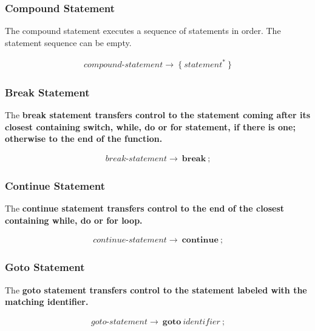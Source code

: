 \documentclass[a4paper,oneside,11pt]{article}
\begin{document}
\subsubsection{Compound Statement}\label{compoundstatement}

The compound statement executes a sequence of statements in order. The statement sequence can be empty.

\begin{align*}
compound\textrm{-}statement \rightarrow \> \texttt{\{} \> \hyperref[statement]{statement}^* \> \texttt{\}}
\end{align*}

\subsubsection{Break Statement}\label{breakstatement}

The \bf{break} statement transfers control to the statement coming after its closest containing \bf{switch}, \bf{while}, \bf{do} or \bf{for} statement,
if there is one; otherwise to the end of the function.

\begin{align*}
break\textrm{-}statement \rightarrow \> \textbf{break} \> \texttt{;}
\end{align*}

\subsubsection{Continue Statement}\label{continuestatement}

The \bf{continue} statement transfers control to the end of the closest containing \bf{while}, \bf{do} or \bf{for} loop.

\begin{align*}
continue\textrm{-}statement \rightarrow \> \textbf{continue} \> \texttt{;}
\end{align*}

\subsubsection{Goto Statement}\label{gotostatement}

The \bf{goto} statement transfers control to the statement labeled with the matching identifier.

\begin{align*}
goto\textrm{-}statement \rightarrow \> \textbf{goto} \> \hyperref[identifier]{identifier} \> \texttt{;}
\end{align*}
\end{document}
